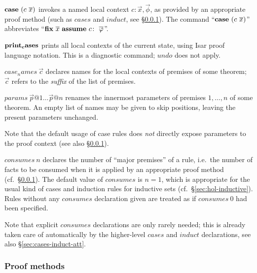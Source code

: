 \begin{descr}

\item [${\mathord{\mathbf{case}}}~(c~\overline{x})$] invokes a named local context $c\colon \vec x,
  \vec \phi$, as provided by an appropriate proof method (such as $cases$ and
  $induct$, see \S\ref{sec:cases-induct-meth}).  The command ``${\mathord{\mathbf{case}}}~(c~\overline{x})$'' abbreviates ``$\FIX{\vec x}~\ASSUME{c}{\vec\phi}$''.

\item [${\mathord{\mathbf{print_cases}}}$] prints all local contexts of the current
  state, using Isar proof language notation.  This is a diagnostic command;
  $undo$ does not apply.

\item [$case_names~\vec c$] declares names for the local contexts of premises
  of some theorem; $\vec c$ refers to the \emph{suffix} of the list of
  premises.

\item [$params~\vec p@1 \dots \vec p@n$] renames the innermost parameters of
  premises $1, \dots, n$ of some theorem.  An empty list of names may be given
  to skip positions, leaving the present parameters unchanged.

  Note that the default usage of case rules does \emph{not} directly expose
  parameters to the proof context (see also \S\ref{sec:cases-induct-meth}).

\item [$consumes~n$] declares the number of ``major premises'' of a rule,
  i.e.\ the number of facts to be consumed when it is applied by an
  appropriate proof method (cf.\ \S\ref{sec:cases-induct-meth}).  The default
  value of $consumes$ is $n = 1$, which is appropriate for the usual kind of
  cases and induction rules for inductive sets (cf.\
  \S\ref{sec:hol-inductive}).  Rules without any $consumes$ declaration given
  are treated as if $consumes~0$ had been specified.

  Note that explicit $consumes$ declarations are only rarely needed; this is
  already taken care of automatically by the higher-level $cases$ and $induct$
  declarations, see also \S\ref{sec:cases-induct-att}.

\end{descr}


\subsubsection{Proof methods}\label{sec:cases-induct-meth}

